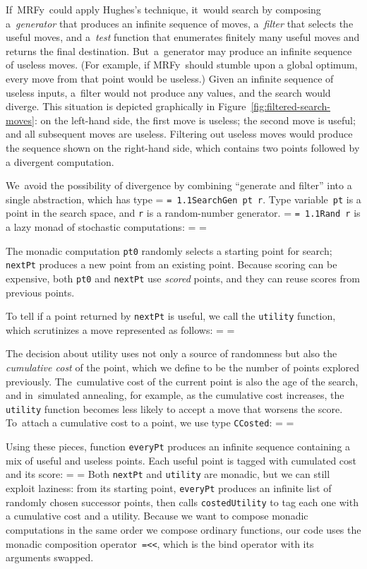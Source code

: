 \documentclass[]{jfp1}
\makeatletter
\newcommand\mrfy{MRFy} %
\newcommand\figref[1]{Figure~\ref{fig:#1}}
\newif\ifverbatimsmall
\newcommand{\mono}[1]{%
  {\@tempdima = \fontdimen2\font
   \texttt{\spaceskip = 1.1\@tempdima #1}}}
\newcommand\smallverbatiminput[1]{%
  \verbatimsmalltrue
  \presvtopsep=\topsep
  \topsep=0.78\topsep
  \verbatimsmallfalse
  \topsep=\presvtopsep
}
\newcommand\smallfuzzverbatiminput[2]{%
  \hfuzz=#1 \smallverbatiminput{#2}\hfuzz=0pt }
\makeatother
\begin{document}
If~\mrfy\ could apply Hughes's technique, it~would search by composing
a~\emph{generator} 
that produces an infinite sequence of moves, 
a~\emph{filter} that selects the useful moves, and 
a~\emph{test} function that enumerates finitely many useful moves
and returns the final destination.
But~a~generator may produce an infinite sequence of useless moves.
(For example, if \mrfy\ should stumble upon a global optimum, every move from
that point would be useless.)
Given an infinite sequence of useless inputs, a~filter would not
produce any values, and the search would diverge.
This situation is depicted graphically in
\figref{filtered-search-moves}:
on the left-hand side, 
the first move is useless; the second move is useful; and all
subsequent moves are useless.
Filtering out useless moves would produce the sequence shown on the
right-hand side, which contains two points followed by a divergent
computation. 

We~avoid the possibility of divergence by combining ``generate and
filter'' into a 
single abstraction, which has type \mono{SearchGen pt r}.
Type variable~\texttt{pt} is a point in the search
space, and \texttt{r} is a
random-number generator.
\mono{Rand~r} is a lazy monad of stochastic computations:
\smallverbatiminput{gen.tex}
The monadic computation \texttt{pt0} randomly selects a starting point
for search;
\texttt{nextPt} produces a new point from
an existing point.
Because scoring can be expensive, both \texttt{pt0}
and \texttt{nextPt} use \emph{scored} points, and they can
reuse scores from previous points.

To tell if a point returned by \texttt{nextPt} is useful, we call
 the \texttt{utility} function,
which scrutinizes a move represented as follows:
\smallverbatiminput{move}
The decision about utility uses not only a source of randomness but
also the \emph{cumulative cost} of the point, which we define to be
the number of points explored previously.
The~cumulative cost of the current point is also the age of the
search,
and
in~simulated annealing, for example, as the cumulative cost increases,
the \texttt{utility} function becomes less likely to accept a move
that worsens the score.
To~attach a cumulative cost to a point, we use type \texttt{CCosted}:
\smallverbatiminput{aged}

Using these pieces, function \texttt{everyPt} produces an infinite
sequence containing a mix of useful and useless points.
Each useful point is tagged with cumulated cost and its score:
\smallfuzzverbatiminput{6pt}{everygen}
Both \texttt{nextPt} and \texttt{utility} are monadic, but 
we can still exploit laziness:
from its starting point, \texttt{everyPt} produces an infinite list of
randomly chosen successor points, then calls \texttt{costedUtility} to
tag each one with a cumulative cost and a utility.
Because we want to compose monadic computations in the same order we
compose ordinary functions, 
our code uses the monadic composition
operator~\texttt{=<<}, which is the bind operator with its arguments
swapped.
\end{document}
